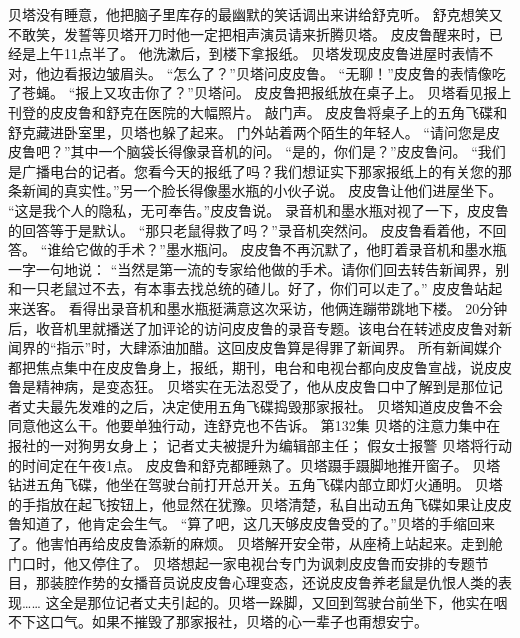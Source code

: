 \documentclass[a4paper,12pt,UTF8,twoside]{ctexbook}
\begin{document}
        贝塔没有睡意，他把脑子里库存的最幽默的笑话调出来讲给舒克听。 
        舒克想笑又不敢笑，发誓等贝塔开刀时他一定把相声演员请来折腾贝塔。 
        皮皮鲁醒来时，已经是上午11点半了。 
        他洗漱后，到楼下拿报纸。 
        贝塔发现皮皮鲁进屋时表情不对，他边看报边皱眉头。 
        “怎么了？”贝塔问皮皮鲁。 
        “无聊！”皮皮鲁的表情像吃了苍蝇。 
        “报上又攻击你了？”贝塔问。 
        皮皮鲁把报纸放在桌子上。 
        贝塔看见报上刊登的皮皮鲁和舒克在医院的大幅照片。 
        敲门声。 
        皮皮鲁将桌子上的五角飞碟和舒克藏进卧室里，贝塔也躲了起来。 
        门外站着两个陌生的年轻人。 
        “请问您是皮皮鲁吧？”其中一个脑袋长得像录音机的问。 
        “是的，你们是？”皮皮鲁问。 
        “我们是广播电台的记者。您看今天的报纸了吗？我们想证实下那家报纸上的有关您的那条新闻的真实性。”另一个脸长得像墨水瓶的小伙子说。 
        皮皮鲁让他们进屋坐下。 
        “这是我个人的隐私，无可奉告。”皮皮鲁说。 
        录音机和墨水瓶对视了一下，皮皮鲁的回答等于是默认。 
        “那只老鼠得救了吗？”录音机突然问。 
        皮皮鲁看着他，不回答。 
        “谁给它做的手术？”墨水瓶问。 
        皮皮鲁不再沉默了，他盯着录音机和墨水瓶一字一句地说：  “当然是第一流的专家给他做的手术。请你们回去转告新闻界，别和一只老鼠过不去，有本事去找总统的碴儿。好了，你们可以走了。” 
        皮皮鲁站起来送客。 
        看得出录音机和墨水瓶挺满意这次采访，他俩连蹦带跳地下楼。 
        20分钟后，收音机里就播送了加评论的访问皮皮鲁的录音专题。该电台在转述皮皮鲁对新闻界的“指示”时，大肆添油加醋。这回皮皮鲁算是得罪了新闻界。 
        所有新闻媒介都把焦点集中在皮皮鲁身上，报纸，期刊，电台和电视台都向皮皮鲁宣战，说皮皮鲁是精神病，是变态狂。 
        贝塔实在无法忍受了，他从皮皮鲁口中了解到是那位记者丈夫最先发难的之后，决定使用五角飞碟捣毁那家报社。 
        贝塔知道皮皮鲁不会同意他这么干。他要单独行动，连舒克也不告诉。   第132集 
        贝塔的注意力集中在报社的一对狗男女身上； 
        记者丈夫被提升为编辑部主任； 
        假女士报警   
        贝塔将行动的时间定在午夜1点。 
        皮皮鲁和舒克都睡熟了。贝塔蹑手蹑脚地推开窗子。 
        贝塔钻进五角飞碟，他坐在驾驶台前打开总开关。五角飞碟内部立即灯火通明。 
        贝塔的手指放在起飞按钮上，他显然在犹豫。贝塔清楚，私自出动五角飞碟如果让皮皮鲁知道了，他肯定会生气。 
        “算了吧，这几天够皮皮鲁受的了。”贝塔的手缩回来了。他害怕再给皮皮鲁添新的麻烦。 
        贝塔解开安全带，从座椅上站起来。走到舱门口时，他又停住了。 
        贝塔想起一家电视台专门为讽刺皮皮鲁而安排的专题节目，那装腔作势的女播音员说皮皮鲁心理变态，还说皮皮鲁养老鼠是仇恨人类的表现…… 
        这全是那位记者丈夫引起的。贝塔一跺脚，又回到驾驶台前坐下，他实在咽不下这口气。如果不摧毁了那家报社，贝塔的心一辈子也甭想安宁。 
\end{document}
